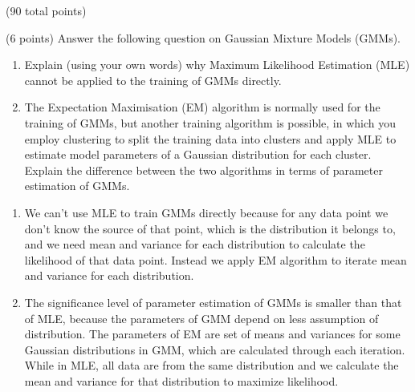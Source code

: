 \documentclass[12pt]{article}
\begin{document}
\begin{question}{(90 total points) \qTwoTitle}
\begin{subquestion}
\end{subquestion}

\begin{subquestion}{(6 points)
    Answer the following question on Gaussian Mixture Models (GMMs).
  } \label{q2:gmm-1}
  \begin{enumerate}\NARROWITEM
  \item Explain (using your own words) why Maximum Likelihood Estimation (MLE) cannot be applied to the training of GMMs directly.
  \item The Expectation Maximisation (EM) algorithm is normally used for the training of GMMs, but another training algorithm is possible, in which you employ \kmeans clustering to split the training data into clusters and apply MLE to estimate model parameters of a Gaussian distribution for each cluster. Explain the difference between the two algorithms in terms of parameter estimation of GMMs.
    \end{enumerate}
   

  \begin{answerbox}{0.6\textheight}
    \begin{enumerate}
    \item We can't use MLE to train GMMs directly because for any data point we don't know the source of that point, which is the distribution it belongs to, and we need mean and variance for each distribution to calculate the likelihood of that data point. Instead we apply EM algorithm to iterate mean and variance for each distribution.
    \item The significance level of parameter estimation of GMMs is smaller than that of MLE, because the parameters of GMM depend on less assumption of distribution. The parameters of EM are set of means and variances for some Gaussian distributions in GMM, which are calculated through each iteration. While in MLE, all data are from the same distribution and we calculate the mean and variance for that distribution to maximize likelihood.
    \end{enumerate}
  \end{answerbox}
  


\end{subquestion}



\end{question}
\end{document}
